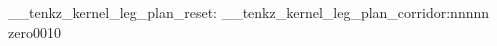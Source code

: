\documentclass{standalone}
\begin{document}
\ExplSyntaxOn
\__tenkz_kernel_leg_plan_reset:
\__tenkz_kernel_leg_plan_corridor:nnnnn {zero}{0}{0}{1}{0}
\ExplSyntaxOff
\end{document}
